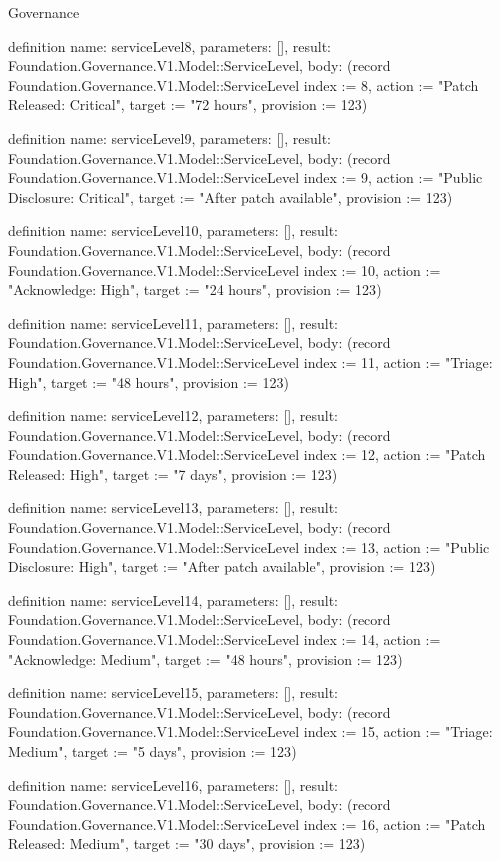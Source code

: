 \begin{lexlean}{Governance}
\begin{semanticmodule}
definition{
  name: serviceLevel8,
  parameters: [],
  result: Foundation.Governance.V1.Model::ServiceLevel,
  body: (record Foundation.Governance.V1.Model::ServiceLevel {index := 8, action := "Patch Released: Critical", target := "72 hours", provision := 123})
}

definition{
  name: serviceLevel9,
  parameters: [],
  result: Foundation.Governance.V1.Model::ServiceLevel,
  body: (record Foundation.Governance.V1.Model::ServiceLevel {index := 9, action := "Public Disclosure: Critical", target := "After patch available", provision := 123})
}

definition{
  name: serviceLevel10,
  parameters: [],
  result: Foundation.Governance.V1.Model::ServiceLevel,
  body: (record Foundation.Governance.V1.Model::ServiceLevel {index := 10, action := "Acknowledge: High", target := "24 hours", provision := 123})
}

definition{
  name: serviceLevel11,
  parameters: [],
  result: Foundation.Governance.V1.Model::ServiceLevel,
  body: (record Foundation.Governance.V1.Model::ServiceLevel {index := 11, action := "Triage: High", target := "48 hours", provision := 123})
}

definition{
  name: serviceLevel12,
  parameters: [],
  result: Foundation.Governance.V1.Model::ServiceLevel,
  body: (record Foundation.Governance.V1.Model::ServiceLevel {index := 12, action := "Patch Released: High", target := "7 days", provision := 123})
}

definition{
  name: serviceLevel13,
  parameters: [],
  result: Foundation.Governance.V1.Model::ServiceLevel,
  body: (record Foundation.Governance.V1.Model::ServiceLevel {index := 13, action := "Public Disclosure: High", target := "After patch available", provision := 123})
}

definition{
  name: serviceLevel14,
  parameters: [],
  result: Foundation.Governance.V1.Model::ServiceLevel,
  body: (record Foundation.Governance.V1.Model::ServiceLevel {index := 14, action := "Acknowledge: Medium", target := "48 hours", provision := 123})
}

definition{
  name: serviceLevel15,
  parameters: [],
  result: Foundation.Governance.V1.Model::ServiceLevel,
  body: (record Foundation.Governance.V1.Model::ServiceLevel {index := 15, action := "Triage: Medium", target := "5 days", provision := 123})
}

definition{
  name: serviceLevel16,
  parameters: [],
  result: Foundation.Governance.V1.Model::ServiceLevel,
  body: (record Foundation.Governance.V1.Model::ServiceLevel {index := 16, action := "Patch Released: Medium", target := "30 days", provision := 123})
}


\end{semanticmodule}
\end{lexlean}
